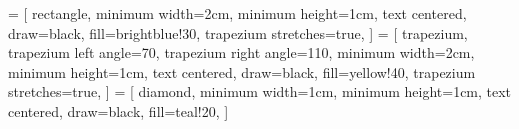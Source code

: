     = [
        rectangle, 
        minimum width=2cm, 
        minimum height=1cm, 
        text centered, 
        draw=black, 
        fill=brightblue!30,
        trapezium stretches=true,
    ]
     = [
        trapezium, 
        trapezium left angle=70, 
        trapezium right angle=110, 
        minimum width=2cm, 
        minimum height=1cm, 
        text centered, 
        draw=black, 
        fill=yellow!40,
        trapezium stretches=true,
    ]
     = [
        diamond, 
        minimum width=1cm, 
        minimum height=1cm, 
        text centered, 
        draw=black, 
        fill=teal!20,
    ]

\usepackage{biblatex}


\usepackage{url}
\usepackage[colorlinks]{hyperref}
\usepackage{cleveref}
